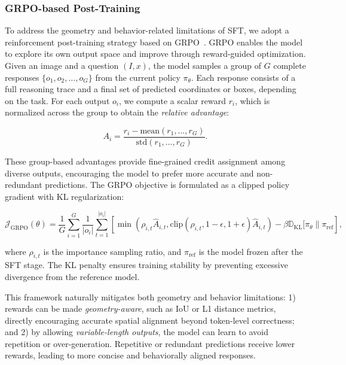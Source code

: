 \subsubsection{GRPO-based Post-Training}
To address the geometry and behavior-related limitations of SFT, we adopt a reinforcement post-training strategy based on GRPO~\cite{deepseekmath}. GRPO enables the model to explore its own output space and improve through reward-guided optimization. Given an image and a question $(I, x)$, the model samples a group of $G$ complete responses $\{o_1, o_2, \dots, o_G\}$ from the current policy $\pi_\theta$. Each response consists of a full reasoning trace and a final set of predicted coordinates or boxes, depending on the task. For each output $o_i$, we compute a scalar reward $r_i$, which is normalized across the group to obtain the \textit{relative advantage}:

\begin{equation}
A_i = \frac{r_i - \mathrm{mean}(r_1, \dots, r_G)}{\mathrm{std}(r_1, \dots, r_G)}.
\end{equation}

\noindent These group-based advantages provide fine-grained credit assignment among diverse outputs, encouraging the model to prefer more accurate and non-redundant predictions. The GRPO objective is formulated as a clipped policy gradient with KL regularization:

\begin{equation}
\mathcal{J}_{\text{GRPO}}(\theta) = \frac{1}{G} \sum_{i=1}^G \frac{1}{|o_i|} \sum_{t=1}^{|o_i|} \left[\min \left(\rho_{i,t} \hat{A}_{i,t}, \text{clip}(\rho_{i,t}, 1 - \epsilon, 1 + \epsilon)\hat{A}_{i,t} \right) - \beta \mathbb{D}_{\text{KL}}[\pi_\theta \| \pi_{\text{ref}} \right],
\end{equation}

\noindent where $\rho_{i,t}$ is the importance sampling ratio, and $\pi_{\text{ref}}$ is the model frozen after the SFT stage. The KL penalty ensures training stability by preventing excessive divergence from the reference model.

This framework naturally mitigates both geometry and behavior limitations: 1) rewards can be made \textit{geometry-aware}, such as IoU or L1 distance metrics, directly encouraging accurate spatial alignment beyond token-level correctness; and 2) by allowing \textit{variable-length outputs}, the model can learn to avoid repetition or over-generation. Repetitive or redundant predictions receive lower rewards, leading to more concise and behaviorally aligned responses.

